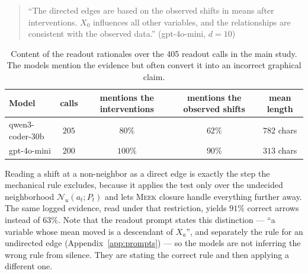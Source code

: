 \documentclass{article}
\newcommand{\meek}{\textsc{Meek}}
\begin{document}
\begin{quote}\small
``The directed edges are based on the observed shifts in means after interventions. $X_0$
influences all other variables, and the relationships are consistent with the observed
data.'' \hfill (gpt-4o-mini, $d=10$)
\end{quote}

\begin{table}[h]
\caption{Content of the readout rationales over the 405 readout calls in the main study. The
models mention the evidence but often convert it into an incorrect graphical claim.}
\label{tab:rationale}
\centering
\small
\begin{tabular}{lcccc}
\toprule
Model & calls & mentions the interventions & mentions the observed shifts & mean length \\
\midrule
qwen3-coder-30b & $205$ & $80\%$ & $62\%$ & $782$ chars \\
gpt-4o-mini & $200$ & $100\%$ & $90\%$ & $313$ chars \\
\bottomrule
\end{tabular}
\end{table}

Reading a shift at a non-neighbor as a direct edge is exactly the step the mechanical rule
excludes, because it applies the test only over the undecided neighborhood
$\mathcal{N}_u(a_t; P_t)$ and lets \meek{} closure handle everything further away. The same
logged evidence, read under that restriction, yields $91\%$ correct arrows instead of $63\%$.
Note that the readout prompt states this distinction --- ``a variable whose mean moved is a
descendant of $X_a$'', and separately the rule for an undirected edge
(Appendix~\ref{app:prompts}) --- so the models are not inferring the wrong rule from silence.
They are stating the correct rule and then applying a different one.
\end{document}
